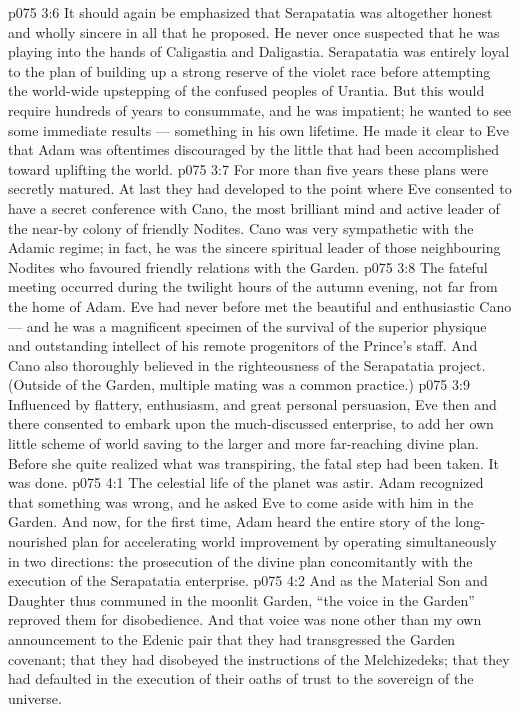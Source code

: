 \vs p075 3:6 It should again be emphasized that Serapatatia was altogether honest and wholly sincere in all that he proposed. He never once suspected that he was playing into the hands of Caligastia and Daligastia. Serapatatia was entirely loyal to the plan of building up a strong reserve of the violet race before attempting the world\hyp{}wide upstepping of the confused peoples of Urantia. But this would require hundreds of years to consummate, and he was impatient; he wanted to see some immediate results --- something in his own lifetime. He made it clear to Eve that Adam was oftentimes discouraged by the little that had been accomplished toward uplifting the world.
\vs p075 3:7 \pc For more than five years these plans were secretly matured. At last they had developed to the point where Eve consented to have a secret conference with Cano, the most brilliant mind and active leader of the near\hyp{}by colony of friendly Nodites. Cano was very sympathetic with the Adamic regime; in fact, he was the sincere spiritual leader of those neighbouring Nodites who favoured friendly relations with the Garden.
\vs p075 3:8 The fateful meeting occurred during the twilight hours of the autumn evening, not far from the home of Adam. Eve had never before met the beautiful and enthusiastic Cano --- and he was a magnificent specimen of the survival of the superior physique and outstanding intellect of his remote progenitors of the Prince’s staff. And Cano also thoroughly believed in the righteousness of the Serapatatia project. (Outside of the Garden, multiple mating was a common practice.)
\vs p075 3:9 Influenced by flattery, enthusiasm, and great personal persuasion, Eve then and there consented to embark upon the much\hyp{}discussed enterprise, to add her own little scheme of world saving to the larger and more far\hyp{}reaching divine plan. Before she quite realized what was transpiring, the fatal step had been taken. It was done.
\vs p075 4:1 The celestial life of the planet was astir. Adam recognized that something was wrong, and he asked Eve to come aside with him in the Garden. And now, for the first time, Adam heard the entire story of the long\hyp{}nourished plan for accelerating world improvement by operating simultaneously in two directions: the prosecution of the divine plan concomitantly with the execution of the Serapatatia enterprise.
\vs p075 4:2 And as the Material Son and Daughter thus communed in the moonlit Garden, “the voice in the Garden” reproved them for disobedience. And that voice was none other than my own announcement to the Edenic pair that they had transgressed the Garden covenant; that they had disobeyed the instructions of the Melchizedeks; that they had defaulted in the execution of their oaths of trust to the sovereign of the universe.
